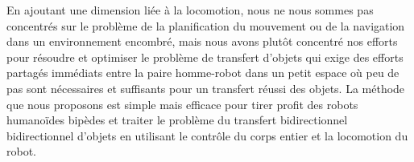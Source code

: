 
En ajoutant une dimension liée à la locomotion, nous ne nous sommes pas concentrés sur le problème de la planification du mouvement ou de la navigation dans un environnement encombré, mais nous avons plutôt concentré nos efforts pour résoudre et optimiser le problème de transfert d'objets qui exige des efforts partagés immédiats entre la paire homme-robot dans un petit espace où peu de pas sont nécessaires et suffisants pour un transfert réussi des objets. La méthode que nous proposons est simple mais efficace pour tirer profit des robots humanoïdes bipèdes et traiter le problème du transfert bidirectionnel bidirectionnel d'objets en utilisant le contrôle du corps entier et la locomotion du robot.


\clearpage %
